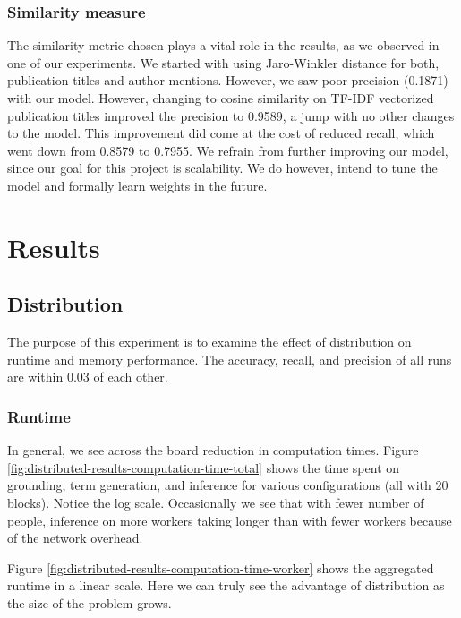 \documentclass{article}
\begin{document}
            
            \subsubsection{Similarity measure}
            
                The similarity metric chosen plays a vital role in the results, as we observed in one of our experiments. We started with using Jaro-Winkler distance for both, publication titles and author mentions. However, we saw poor precision (0.1871) with our model. However, changing to cosine similarity on TF-IDF vectorized publication titles improved the precision to 0.9589, a jump with no other changes to the model. This improvement did come at the cost of reduced recall, which went down from 0.8579 to 0.7955. We refrain from further improving our model, since our goal for this project is scalability. We do however, intend to tune the model and formally learn weights in the future.


\section{Results}
    
    \subsection{Distribution}
    
        The purpose of this experiment is to examine the effect of distribution on runtime and memory performance.
        The accuracy, recall, and precision of all runs are within 0.03 of each other.
    
        \subsubsection{Runtime}

            In general, we see across the board reduction in computation times.
            Figure \ref{fig:distributed-results-computation-time-total} shows the time spent on grounding, term generation, and inference for various configurations (all with 20 blocks).
            Notice the log scale.
            Occasionally we see that with fewer number of people, inference on more workers taking longer than with fewer workers because of the network overhead.
            
            Figure \ref{fig:distributed-results-computation-time-worker} shows the aggregated runtime in a linear scale.
            Here we can truly see the advantage of distribution as the size of the problem grows.
            
\end{document}
